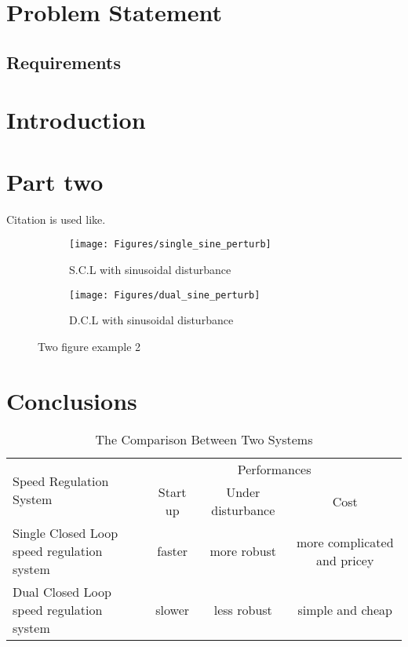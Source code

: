 \documentclass[11pt,english, openany,a4paper]{book}
\begin{document}
\chapter{Problem Statement}\label{chapt:problem}

\lipsum[1-2]

\section{Requirements} 



\chapter{Introduction}\label{chapt:intro}



\lipsum[1]

\vspace{0.6cm}
\begin{tcolorbox}[title=\textbf{tcolorbox example}]
	\lipsum[2]
\end{tcolorbox}

\chapter{Part two}
Citation is used like\cite{ex}.

\begin{figure}[H]
	\centering
	\begin{subfigure}{0.49\linewidth} \centering
		\texttt{[image: Figures/single\_sine\_perturb]}
		\caption{S.C.L with sinusoidal disturbance}\label{fig:figA}
	\end{subfigure}
	\begin{subfigure}{0.49\linewidth} \centering
		\texttt{[image: Figures/dual\_sine\_perturb]}
		\caption{D.C.L with sinusoidal disturbance}\label{fig:figB}
	\end{subfigure}
	\caption{Two figure example 2} \label{fig:twodisturb}
\end{figure}
\chapter{Conclusions}

\lipsum[2]


\begin{table}[b]
	\centering
	\small
	\begin{tabular}{lccc}
		\toprule
		\multirow{2}{*}{Speed Regulation System} & \multicolumn{3}{c}{Performances} \\ \cmidrule(lr){2-4}
		& Start up &  Under disturbance &  Cost \\
		\midrule
		Single Closed Loop speed regulation system  & faster & more robust & more complicated and pricey \\
		Dual Closed Loop speed regulation system & slower & less robust & simple and cheap \\
		\bottomrule
	\end{tabular}
	\caption{The Comparison Between Two Systems}
	\label{tab-label-1}
\end{table}
\end{document}
